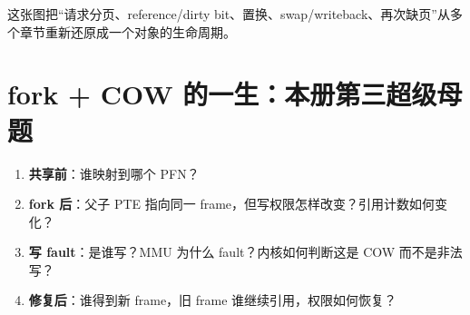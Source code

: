 \documentclass[11pt,a4paper]{ctexart}
\newcommand{\kw}[1]{\textbf{#1}}
\begin{document}
这张图把“请求分页、reference/dirty bit、置换、swap/writeback、再次缺页”从多个章节重新还原成一个对象的生命周期。

\section{fork + COW 的一生：本册第三超级母题}
\begin{method}
\begin{enumerate}
  \item \kw{共享前}：谁映射到哪个 PFN？
  \item \kw{fork 后}：父子 PTE 指向同一 frame，但写权限怎样改变？引用计数如何变化？
  \item \kw{写 fault}：是谁写？MMU 为什么 fault？内核如何判断这是 COW 而不是非法写？
  \item \kw{修复后}：谁得到新 frame，旧 frame 谁继续引用，权限如何恢复？
\end{enumerate}
\end{method}
\end{document}
